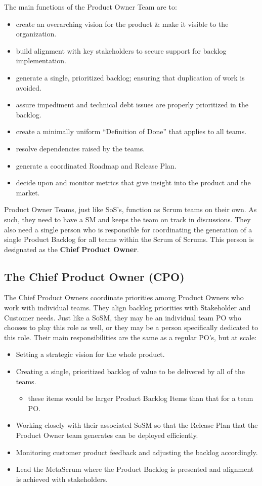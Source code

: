 \documentclass[12pt,a4paper,parskip=full]{scrartcl}
\begin{document}
The main functions of the Product Owner Team are to:
\begin{itemize}
\item create an overarching vision for the product \& make it visible to
the organization.
\item build alignment with key stakeholders to secure support for backlog
implementation.
\item generate a single, prioritized backlog; ensuring that duplication of
work is avoided.
\item assure impediment and technical debt issues are properly prioritized in the backlog.
\item create a minimally uniform ``Definition of Done'' that applies to all teams.
\item resolve dependencies raised by the teams.
\item generate a coordinated Roadmap and Release Plan.
\item decide upon and monitor metrics that give insight into the product and the market.
\end{itemize}
Product Owner Teams, just like SoS's, function as Scrum teams on their own. As such,
they need to have a SM and keeps the team on track in
discussions. They also need a single person who is responsible for coordinating the
generation of a single Product Backlog for all teams within the Scrum of Scrums.
This person is designated as the \textbf{Chief Product Owner}.

\subsection{The Chief Product Owner (CPO)}
The Chief Product Owners coordinate priorities among
Product Owners who work with individual teams. They align backlog
priorities with Stakeholder and Customer needs. Just like a SoSM, they may
be an individual team PO who chooses to play this role as well, or they may
be a person specifically dedicated to this role. Their main
responsibilities are the same as a regular PO's, but at scale:
\begin{itemize}
\item Setting a strategic vision for the whole product.
\item Creating a single, prioritized backlog of value to be delivered by
all of the teams.
\begin{itemize}
\item these items would be larger Product Backlog Items than that for a team PO.
\end{itemize}
\item Working closely with their associated SoSM so that the Release Plan
that the Product Owner team generates can be deployed efficiently.
\item Monitoring customer product feedback and adjusting the backlog
accordingly.
\item Lead the MetaScrum where the Product Backlog is presented and alignment is achieved with stakeholders.
\end{itemize}
\end{document}
